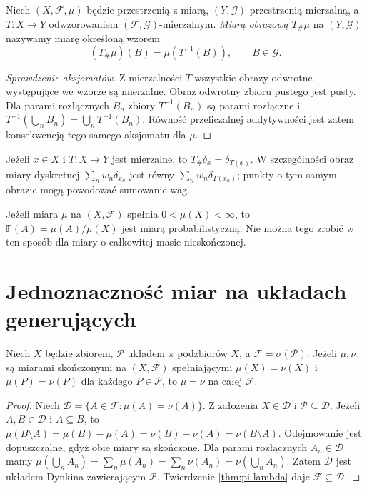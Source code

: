 \begin{definicja}
\label{def:pushforward}
Niech $(X,\mathcal F,\mu)$ będzie przestrzenią z miarą,
$(Y,\mathcal G)$ przestrzenią mierzalną, a
$T:X\to Y$ odwzorowaniem $(\mathcal F,\mathcal G)$-mierzalnym.
\emph{Miarą obrazową} $T_\#\mu$ na $(Y,\mathcal G)$ nazywamy
miarę określoną wzorem
\[
(T_\#\mu)(B)=\mu(T^{-1}(B)),\qquad B\in\mathcal G.
\]
\end{definicja}

\begin{proof}[Sprawdzenie aksjomatów]
Z mierzalności $T$ wszystkie obrazy odwrotne występujące
we wzorze są mierzalne. Obraz odwrotny zbioru pustego
jest pusty. Dla parami rozłącznych $B_n$ zbiory
$T^{-1}(B_n)$ są parami rozłączne i
$T^{-1}(\bigcup_nB_n)=\bigcup_nT^{-1}(B_n)$.
Równość przeliczalnej addytywności jest zatem konsekwencją
tego samego aksjomatu dla $\mu$.
\end{proof}

\begin{przyklad}
Jeżeli $x\in X$ i $T:X\to Y$ jest mierzalne, to
$T_\#\delta_x=\delta_{T(x)}$.
W szczególności obraz miary dyskretnej
$\sum_nw_n\delta_{x_n}$ jest równy
$\sum_nw_n\delta_{T(x_n)}$; punkty o tym samym obrazie
mogą powodować sumowanie wag.
\end{przyklad}

\begin{przyklad}[Normalizacja]
Jeżeli miara $\mu$ na $(X,\mathcal F)$ spełnia
$0<\mu(X)<\infty$, to $\mathbb P(A)=\mu(A)/\mu(X)$
jest miarą probabilistyczną. Nie można tego zrobić
w ten sposób dla miary o całkowitej masie nieskończonej.
\end{przyklad}

\section{Jednoznaczność miar na układach generujących}

\begin{twierdzenie}
\label{thm:uniqueness-finite}
Niech $X$ będzie zbiorem, $\mathcal P$ układem $\pi$
podzbiorów $X$, a $\mathcal F=\sigma(\mathcal P)$.
Jeżeli $\mu,\nu$ są miarami skończonymi na $(X,\mathcal F)$
spełniającymi $\mu(X)=\nu(X)$ i
$\mu(P)=\nu(P)$ dla każdego $P\in\mathcal P$,
to $\mu=\nu$ na całej $\mathcal F$.
\end{twierdzenie}
\begin{proof}
Niech $\mathcal D=\{A\in\mathcal F:\mu(A)=\nu(A)\}$.
Z założenia $X\in\mathcal D$ i $\mathcal P\subseteq\mathcal D$.
Jeżeli $A,B\in\mathcal D$ i $A\subseteq B$, to
$\mu(B\setminus A)=\mu(B)-\mu(A)
=\nu(B)-\nu(A)=\nu(B\setminus A)$.
Odejmowanie jest dopuszczalne, gdyż obie miary są skończone.
Dla parami rozłącznych $A_n\in\mathcal D$ mamy
$\mu(\bigcup_nA_n)=\sum_n\mu(A_n)
=\sum_n\nu(A_n)=\nu(\bigcup_nA_n)$.
Zatem $\mathcal D$ jest układem Dynkina zawierającym
$\mathcal P$. Twierdzenie \ref{thm:pi-lambda} daje
$\mathcal F\subseteq\mathcal D$.
\end{proof}

